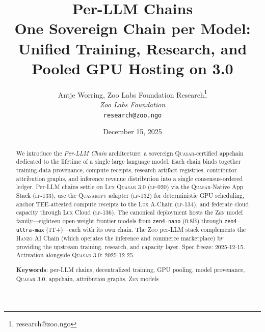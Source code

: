 \documentclass[11pt,letterpaper]{article}
\title{\textbf{Per-LLM Chains}\\
\large One Sovereign Chain per Model: Unified Training, Research, and Pooled GPU Hosting on \Quasar{} 3.0}
\author{
Antje Worring, Zoo Labs Foundation Research\thanks{research@zoo.ngo}\\
\textit{Zoo Labs Foundation}\\
\texttt{research@zoo.ngo}
}
\date{December 15, 2025}
\newcommand{\Zoo}{\textsc{Zoo}}
\newcommand{\Lux}{\textsc{Lux}}
\newcommand{\Hanzo}{\textsc{Hanzo}}
\newcommand{\Zen}{\textsc{Zen}}
\newcommand{\Quasar}{\textsc{Quasar}}
\newcommand{\GPU}{\textsc{gpu}}
\begin{document}
\zoocoverpage

\begin{abstract}
We introduce the \emph{Per-LLM Chain} architecture: a sovereign \Quasar{}-certified appchain dedicated to the lifetime of a single large language model. Each chain binds together training-data provenance, compute receipts, research artifact registries, contributor attribution graphs, and inference revenue distribution into a single consensus-ordered ledger. Per-LLM chains settle on \Lux{} \Quasar{} 3.0 (\textsc{lp-020}) via the \Quasar{}-Native App Stack (\textsc{lp-133}), use the \Quasar{}\GPU{} adapter (\textsc{lp-132}) for deterministic GPU scheduling, anchor TEE-attested compute receipts to the \Lux{} A-Chain (\textsc{lp-134}), and federate cloud capacity through \Lux{} Cloud (\textsc{lp-136}). The canonical deployment hosts the \Zen{} model family---eighteen open-weight frontier models from \texttt{zen4-nano} (0.8B) through \texttt{zen4-ultra-max} (1T+)---each with its own chain. The \Zoo{} per-LLM stack complements the \Hanzo{} AI Chain (which operates the inference and commerce marketplace) by providing the upstream training, research, and capacity layer. Spec freeze: 2025-12-15. Activation alongside \Quasar{} 3.0: 2025-12-25.

\textbf{Keywords}: per-LLM chains, decentralized training, GPU pooling, model provenance, \Quasar{} 3.0, appchain, attribution graphs, \Zen{} models
\end{abstract}

\tableofcontents
\newpage













\end{document}
